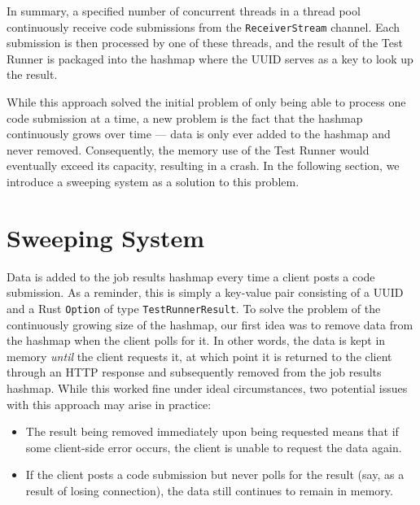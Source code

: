 In summary, a specified number of concurrent threads in a thread pool continuously receive code submissions from the \texttt{ReceiverStream} channel.
Each submission is then processed by one of these threads, and the result of the Test Runner is packaged into the hashmap where the UUID serves as a key to look up the result.

While this approach solved the initial problem of only being able to process one code submission at a time, a new problem is the fact that the hashmap continuously grows over time --- data is only ever added to the hashmap and never removed.
Consequently, the memory use of the Test Runner would eventually exceed its capacity, resulting in a crash.
In the following section, we introduce a sweeping system as a solution to this problem.

\section{Sweeping System}
Data is added to the job results hashmap every time a client posts a code submission.
As a reminder, this is simply a key-value pair consisting of a UUID and a Rust \texttt{Option} of type \texttt{TestRunnerResult}.
To solve the problem of the continuously growing size of the hashmap, our first idea was to remove data from the hashmap when the client polls for it.
In other words, the data is kept in memory \textit{until} the client requests it, at which point it is returned to the client through an HTTP response and subsequently removed from the job results hashmap.
While this worked fine under ideal circumstances, two potential issues with this approach may arise in practice:
\begin{itemize}
    \item The result being removed immediately upon being requested means that if some client-side error occurs, the client is unable to request the data again.
    \item If the client posts a code submission but never polls for the result (say, as a result of losing connection), the data still continues to remain in memory.
\end{itemize}

